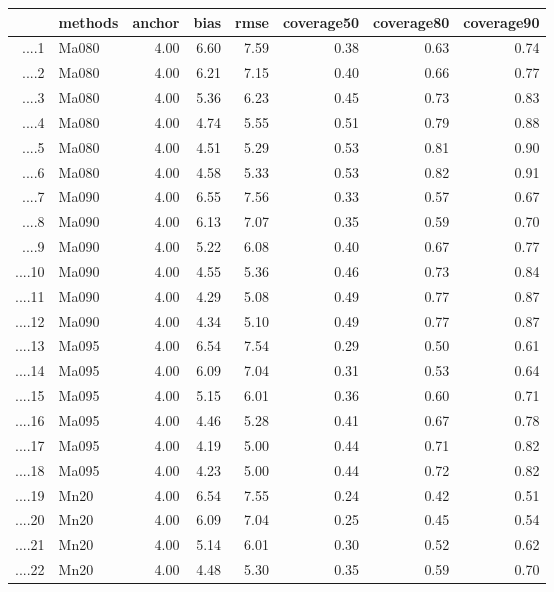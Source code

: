 \begin{table}[ht]
\centering
\begin{tabular}{rlrrrrrr}
  \hline
 & methods & anchor & bias & rmse & coverage50 & coverage80 & coverage90 \\ 
  \hline
....1 & Ma080 & 4.00 & 6.60 & 7.59 & 0.38 & 0.63 & 0.74 \\ 
  ....2 & Ma080 & 4.00 & 6.21 & 7.15 & 0.40 & 0.66 & 0.77 \\ 
  ....3 & Ma080 & 4.00 & 5.36 & 6.23 & 0.45 & 0.73 & 0.83 \\ 
  ....4 & Ma080 & 4.00 & 4.74 & 5.55 & 0.51 & 0.79 & 0.88 \\ 
  ....5 & Ma080 & 4.00 & 4.51 & 5.29 & 0.53 & 0.81 & 0.90 \\ 
  ....6 & Ma080 & 4.00 & 4.58 & 5.33 & 0.53 & 0.82 & 0.91 \\ 
  ....7 & Ma090 & 4.00 & 6.55 & 7.56 & 0.33 & 0.57 & 0.67 \\ 
  ....8 & Ma090 & 4.00 & 6.13 & 7.07 & 0.35 & 0.59 & 0.70 \\ 
  ....9 & Ma090 & 4.00 & 5.22 & 6.08 & 0.40 & 0.67 & 0.77 \\ 
  ....10 & Ma090 & 4.00 & 4.55 & 5.36 & 0.46 & 0.73 & 0.84 \\ 
  ....11 & Ma090 & 4.00 & 4.29 & 5.08 & 0.49 & 0.77 & 0.87 \\ 
  ....12 & Ma090 & 4.00 & 4.34 & 5.10 & 0.49 & 0.77 & 0.87 \\ 
  ....13 & Ma095 & 4.00 & 6.54 & 7.54 & 0.29 & 0.50 & 0.61 \\ 
  ....14 & Ma095 & 4.00 & 6.09 & 7.04 & 0.31 & 0.53 & 0.64 \\ 
  ....15 & Ma095 & 4.00 & 5.15 & 6.01 & 0.36 & 0.60 & 0.71 \\ 
  ....16 & Ma095 & 4.00 & 4.46 & 5.28 & 0.41 & 0.67 & 0.78 \\ 
  ....17 & Ma095 & 4.00 & 4.19 & 5.00 & 0.44 & 0.71 & 0.82 \\ 
  ....18 & Ma095 & 4.00 & 4.23 & 5.00 & 0.44 & 0.72 & 0.82 \\ 
  ....19 & Mn20 & 4.00 & 6.54 & 7.55 & 0.24 & 0.42 & 0.51 \\ 
  ....20 & Mn20 & 4.00 & 6.09 & 7.04 & 0.25 & 0.45 & 0.54 \\ 
  ....21 & Mn20 & 4.00 & 5.14 & 6.01 & 0.30 & 0.52 & 0.62 \\ 
  ....22 & Mn20 & 4.00 & 4.48 & 5.30 & 0.35 & 0.59 & 0.70 \\ 

\end{tabular}
\end{table}
